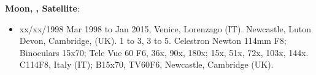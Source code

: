 {\bf Moon, , Satellite}:
\begin{itemize}
\item xx/xx/1998 Mar 1998 to Jan 2015, Venice, Lorenzago (IT). Newcastle, Luton Devon, Cambridge, (UK). 1 to 3, 3 to 5. Celestron Newton 114mm F8; Binoculars 15x70; Tele Vue 60 F6, 36x, 90x, 180x; 15x, 51x, 72x, 103x, 144x. C114F8, Italy (IT); B15x70, TV60F6, Newcastle, Cambridge (UK).
\end{itemize}
